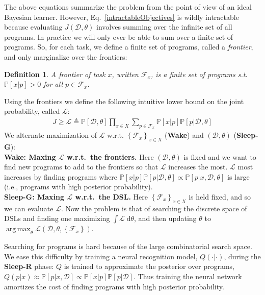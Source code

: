 \documentclass{article}
\newcommand{\lowerBound}{\mathscr{L}}
\DeclareMathOperator*{\argmax}{arg\,max} %
\newcommand{\probability}{\mathds{P}} %
\newtheorem{definition}{Definition}
\begin{document}
The above equations summarize the problem from the point of view of an ideal Bayesian learner.
However, Eq.~\ref{intractableObjectives}
is wildly intractable because evaluating $J(\mathcal{D},\theta)$ involves
summing over the  infinite set of all programs.
In practice we will only ever be able to sum over a finite set of programs.
So, for each task, we define a finite set of programs, called a \emph{frontier}, and only marginalize over the frontiers:
\begin{definition}
   A \emph{frontier of task $x$}, written $\mathcal{F}_x$,
is a finite set of programs s.t. $\probability[x|p] > 0$ for all $p\in \mathcal{F}_x$.
  \end{definition}
Using the frontiers we  define the following intuitive lower bound on the joint probability, called $\lowerBound$:
\begin{align}
 J\geq \lowerBound\triangleq\probability[\mathcal{D},\theta]\prod_{x\in X} \sum_{p\in \mathcal{F}_x} \probability[x|p]\probability[p|\mathcal{D},\theta]
\end{align}
We alternate maximization of $\lowerBound$ w.r.t. $\left\{\mathcal{F}_x \right\}_{x\in X}$  (\textbf{Wake})
and $(\mathcal{D},\theta)$ (\textbf{Sleep-G}):
\\\noindent \textbf{Wake: Maxing $\lowerBound$ w.r.t.\ the frontiers.} Here $(\mathcal{D},\theta)$ is fixed and we
want to find new programs to add to  the frontiers so that $\lowerBound$ increases the most.
$\lowerBound$ most increases by finding programs where $\probability[x|p]\probability[p|\mathcal{D},\theta]\propto\probability[p|x,\mathcal{D},\theta]$ 
is large (i.e., programs with high posterior probability).
\\\noindent \textbf{Sleep-G: Maxing $ \lowerBound$ w.r.t.\ the DSL.} Here $\left\{\mathcal{F}_x \right\}_{x\in X}$ is held fixed, and so we can evaluate $\lowerBound$. Now the problem is that of searching the discrete space of DSLs and finding one maximizing $\int \lowerBound \;\mathrm{d}\theta$,
and then updating $\theta$ to $\argmax_\theta \lowerBound(\mathcal{D},\theta,\left\{\mathcal{F}_x \right\})$.

Searching for programs is hard because
of the large combinatorial search space. We ease this difficulty by training a neural recognition model, $Q(\cdot |\cdot )$,
during the \textbf{Sleep-R} phase: $Q$ is trained to approximate the
posterior over programs, $Q(p|x)\approx \probability[p|x,\mathcal{D}]\propto\probability[x|p]\probability[p|\mathcal{D}]$.
  Thus training the neural network amortizes the cost of finding programs with high posterior probability.
\end{document}
